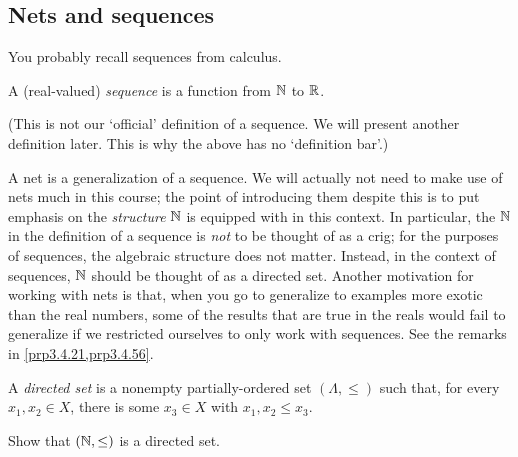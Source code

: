\subsection{Nets and sequences}

You probably recall sequences from calculus.
\begin{textequation}
A (real-valued) \emph{sequence} is a function from $\mathbb{N}$ to $\mathbb{R}$.
\end{textequation}
(This is not our `official' definition of a sequence.  We will present another definition later.  This is why the above has no `definition bar'.)

A net is a generalization of a sequence.  We will actually not need to make use of nets much in this course; the point of introducing them despite this is to put emphasis on the \emph{structure} $\mathbb{N}$ is equipped with in this context.  In particular, the $\mathbb{N}$ in the definition of a sequence is \emph{not} to be thought of as a crig; for the purposes of sequences, the algebraic structure does not matter.  Instead, in the context of sequences, $\mathbb{N}$ should be thought of as a directed set.  Another motivation for working with nets is that, when you go to generalize to examples more exotic than the real numbers, some of the results that are true in the reals would fail to generalize if we restricted ourselves to only work with sequences.  See the remarks in \cref{prp3.4.21,prp3.4.56}.
\begin{dfn}\label{dfn3.3.2}
A \emph{directed set} is a nonempty partially-ordered set $(\Lambda ,\leq )$ such that, for every $x_1,x_2\in X$, there is some $x_3\in X$ with $x_1,x_2\leq x_3$.
\end{dfn}
\begin{exr}
Show that $(\mathbb{N} ,\leq )$ is a directed set.
\end{exr}
